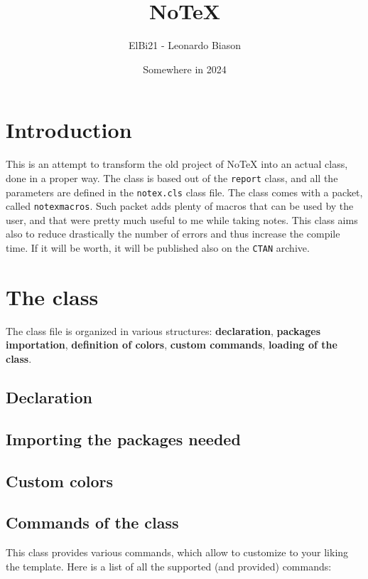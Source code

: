 \documentclass[]{notex}
\title{NoTeX}
\author{ElBi21 - Leonardo Biason}
\date{Somewhere in 2024}
\begin{document}
\maketitle

\chapter{Introduction}

\noindent This is an attempt to transform the old project of NoTeX into an actual class, done in a proper way. The class is based out of the \texttt{report} class, and all the parameters are defined in the \texttt{notex.cls} class file. The class comes with a packet, called \texttt{notexmacros}. Such packet adds plenty of macros that can be used by the user, and that were pretty much useful to me while taking notes. This class aims also to reduce drastically the number of errors and thus increase the compile time. If it will be worth, it will be published also on the \texttt{CTAN} archive.

\chapter{The class}

The class file is organized in various structures: \textbf{declaration}, \textbf{packages importation}, \textbf{definition of colors}, \textbf{custom commands}, \textbf{loading of the class}.

\section{Declaration}

\section{Importing the packages needed}

\section{Custom colors}

\section{Commands of the class}

This class provides various commands, which allow to customize to your liking the template. Here is a list of all the supported (and provided) commands:
\end{document}

